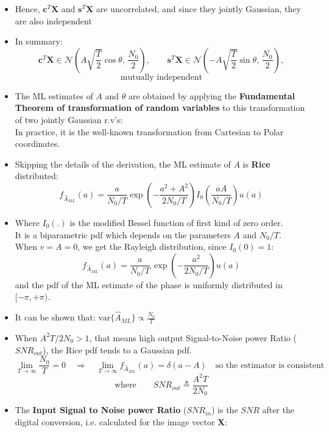 \begin{itemize}
\[\begin{aligned}
     = \mathbf{c}^T \left( \sigma_w^2 \mathbf{I} \right) \mathbf{s} \\ 
    &= \sigma_w^2 \mathbf{c}^T \mathbf{s}
     = 0
\end{aligned}
\]
    \item Hence, \(\mathbf{c}^T\mathbf{X}\) and \(\mathbf{s}^T\mathbf{X}\) are uncorrelated, and since they jointly Gaussian, they are also independent
    \item In summary:
\[
\mathbf{c}^T\mathbf{X} \in \mathcal{N}\left( 
    A\sqrt{\frac{T}{2}}\cos\theta,\, \frac{N_0}{2} 
\right), 
\qquad
\mathbf{s}^T\mathbf{X} \in \mathcal{N}\left( 
    -A\sqrt{\frac{T}{2}}\sin\theta,\, \frac{N_0}{2} 
\right),
\]
\[
\text{mutually independent}
\]
    \item The ML estimates of \(A\) and \(\theta\) are obtained by applying the \textbf{Fundamental Theorem of transformation of random variables} to this transformation of two jointly Gaussian r.v's:\\
    In practice, it is the well-known transformation from Cartesian to Polar coordinates.
    \item Skipping the details of the derivation, the ML estimate of \(A\) is \textbf{Rice} distributed:
    \[
f_{\hat{A}_{ML}}(a) = \frac{a}{N_0/T} \exp\left( -\frac{a^2 + A^2}{2N_0/T} \right) I_0\left(\frac{aA}{N_0/T}\right) u(a)
\]
    \item Where \(I_0(.)\) is the modified Bessel function of first kind of zero order.\\
    It is a biparametric pdf which depends on the parameters \(A\) and \(N_0/T\).\\
    When \(v=A=0\), we get the Rayleigh distribution, since \(I_0(0)=1\):
    \[
    f_{\hat{A}_{ML}}(a) = \frac{a}{N_0/T}\,\exp\left(-\frac{a^2}{2N_0/T}\right) u(a)
    \]
    and the pdf of the ML estimate of the phase is uniformly distributed in \([-\pi,+\pi)\).
    \item It can be shown that: \(\text{var}\{\hat{A}_{ML}\}\propto\frac{N_0}{T}\)
    \item When \(A^2T/2N_0>1\), that means high output Signal-to-Noise power Ratio (\(SNR_{out}\)), the Rice pdf tends to a Gaussian pdf.
    \[
    \lim_{T \to \infty} \frac{N_0}{T} = 0
    \quad \Rightarrow \quad
    \lim_{T \to \infty} f_{\hat{A}_{ML}}(a) = \delta(a-A)
    \quad \text{so the estimator is consistent}
    \]
    \[
    \text{where} \qquad SNR_{out} \triangleq \frac{A^2 T}{2 N_0}
    \]
    \item The \textbf{Input Signal to Noise power Ratio} (\(SNR_{in}\)) is the \(SNR\) after the digital conversion, i.e. calculated for the image vector \textbf{X}:


\end{itemize}

